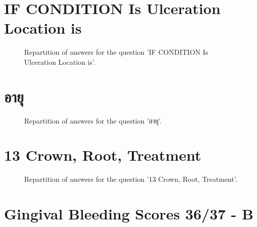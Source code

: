 \documentclass[12pt]{article}
\begin{document}
\clearpage{}
\section{IF CONDITION Is Ulceration
Location is}

\label{sec:172}


\begin{figure}[h!]
    \caption{\label{figure:q172-1}Repartition of answers for the question 'IF CONDITION Is Ulceration
Location is'.}
\end{figure}



\clearpage{}
\section{อายุ}

\label{sec:18}


\begin{figure}[h!]
    \caption{\label{figure:q18-1}Repartition of answers for the question 'อายุ'.}
\end{figure}



\clearpage{}
\section{13
Crown, Root, Treatment}

\label{sec:30}


\begin{figure}[h!]
    \caption{\label{figure:q30-1}Repartition of answers for the question '13
Crown, Root, Treatment'.}
\end{figure}



\clearpage{}
\section{Gingival Bleeding Scores
36/37 - B}
\end{document}

